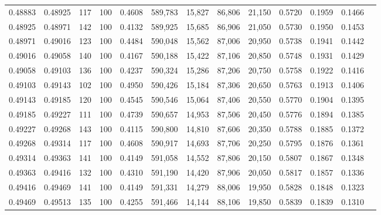 \begin{tabular}{rrrrrrrrrrrrr}
0.48883 & 0.48925 &    117 & 100 &                                     0.4608 & 589,783 &  15,827 &  86,806 &  21,150 & 0.5720 & 0.1959 & 0.1466 \\
0.48925 & 0.48971 &    142 & 100 &                                     0.4132 & 589,925 &  15,685 &  86,906 &  21,050 & 0.5730 & 0.1950 & 0.1453 \\
0.48971 & 0.49016 &    123 & 100 &                                     0.4484 & 590,048 &  15,562 &  87,006 &  20,950 & 0.5738 & 0.1941 & 0.1442 \\
0.49016 & 0.49058 &    140 & 100 &                                     0.4167 & 590,188 &  15,422 &  87,106 &  20,850 & 0.5748 & 0.1931 & 0.1429 \\
0.49058 & 0.49103 &    136 & 100 &                                     0.4237 & 590,324 &  15,286 &  87,206 &  20,750 & 0.5758 & 0.1922 & 0.1416 \\
0.49103 & 0.49143 &    102 & 100 &                                     0.4950 & 590,426 &  15,184 &  87,306 &  20,650 & 0.5763 & 0.1913 & 0.1406 \\
0.49143 & 0.49185 &    120 & 100 &                                     0.4545 & 590,546 &  15,064 &  87,406 &  20,550 & 0.5770 & 0.1904 & 0.1395 \\
0.49185 & 0.49227 &    111 & 100 &                                     0.4739 & 590,657 &  14,953 &  87,506 &  20,450 & 0.5776 & 0.1894 & 0.1385 \\
0.49227 & 0.49268 &    143 & 100 &                                     0.4115 & 590,800 &  14,810 &  87,606 &  20,350 & 0.5788 & 0.1885 & 0.1372 \\
0.49268 & 0.49314 &    117 & 100 &                                     0.4608 & 590,917 &  14,693 &  87,706 &  20,250 & 0.5795 & 0.1876 & 0.1361 \\
0.49314 & 0.49363 &    141 & 100 &                                     0.4149 & 591,058 &  14,552 &  87,806 &  20,150 & 0.5807 & 0.1867 & 0.1348 \\
0.49363 & 0.49416 &    132 & 100 &                                     0.4310 & 591,190 &  14,420 &  87,906 &  20,050 & 0.5817 & 0.1857 & 0.1336 \\
0.49416 & 0.49469 &    141 & 100 &                                     0.4149 & 591,331 &  14,279 &  88,006 &  19,950 & 0.5828 & 0.1848 & 0.1323 \\
0.49469 & 0.49513 &    135 & 100 &                                     0.4255 & 591,466 &  14,144 &  88,106 &  19,850 & 0.5839 & 0.1839 & 0.1310 \\

\end{tabular}
